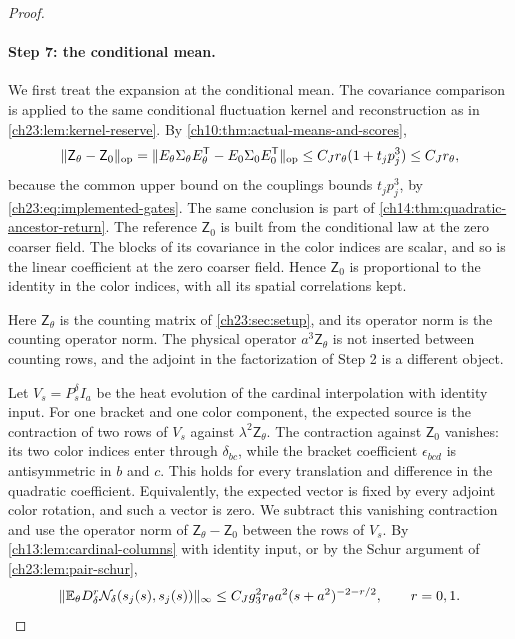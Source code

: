 \begin{proof}
\paragraph{Step 7: the conditional mean.}
We first treat the expansion at the conditional mean. The covariance comparison is applied to the same conditional fluctuation kernel and reconstruction as in \cref{ch23:lem:kernel-reserve}. By \cref{ch10:thm:actual-means-and-scores},
\[
 \lVert \mathsf Z_\theta-\mathsf Z_0\rVert_{\mathrm{op}}=\lVert E_\theta\Sigma_\theta E_\theta^{\mathsf T}-E_0\Sigma_0E_0^{\mathsf T}\rVert_{\mathrm{op}}\le C_Jr_\theta(1+t_jp_j^3)\le C_Jr_\theta,
\]
because the common upper bound on the couplings bounds $t_jp_j^3$, by \eqref{ch23:eq:implemented-gates}. The same conclusion is part of \cref{ch14:thm:quadratic-ancestor-return}. The reference $\mathsf Z_0$ is built from the conditional law at the zero coarser field. The blocks of its covariance in the color indices are scalar, and so is the linear coefficient at the zero coarser field. Hence $\mathsf Z_0$ is proportional to the identity in the color indices, with all its spatial correlations kept.

Here $\mathsf Z_\theta$ is the counting matrix of \cref{ch23:sec:setup}, and its operator norm is the counting operator norm. The physical operator $a^3\mathsf Z_\theta$ is not inserted between counting rows, and the adjoint in the factorization of Step 2 is a different object.

Let $V_s=P_s^\delta I_a$ be the heat evolution of the cardinal interpolation with identity input. For one bracket and one color component, the expected source is the contraction of two rows of $V_s$ against $\lambda^2\mathsf Z_\theta$. The contraction against $\mathsf Z_0$ vanishes: its two color indices enter through $\delta_{bc}$, while the bracket coefficient $\epsilon_{bcd}$ is antisymmetric in $b$ and $c$. This holds for every translation and difference in the quadratic coefficient. Equivalently, the expected vector is fixed by every adjoint color rotation, and such a vector is zero. We subtract this vanishing contraction and use the operator norm of $\mathsf Z_\theta-\mathsf Z_0$ between the rows of $V_s$. By \cref{ch13:lem:cardinal-columns} with identity input, or by the Schur argument of \cref{ch23:lem:pair-schur},
\[
 \lVert \mathbb E_\theta D_\delta^r\mathcal N_\delta(s_j(s),s_j(s))\rVert_\infty\le C_Jg_3^2r_\theta a^2(s+a^2)^{-2-r/2},\qquad r=0,1.
\]


\end{proof}

